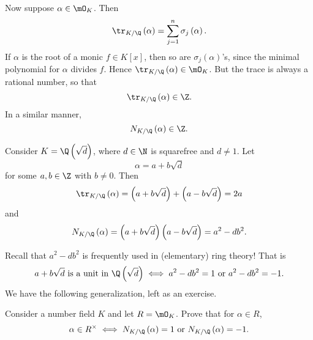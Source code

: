 \documentclass[pmath441]{subfiles}
\begin{document}
    Now suppose $\alpha\in\mO_K$. Then
    \begin{equation*}
        \tr_{K /\Q}\left( \alpha \right) = \sum^{n}_{j=1} \sigma_j\left( \alpha \right).
    \end{equation*}
    If $\alpha$ is the root of a monic $f\in K\left[ x \right]$, then so are $\sigma_j\left( \alpha \right)$'s, since the minimal polynomial for $\alpha$ divides $f$. Hence $\tr_{K /\Q}\left( \alpha \right)\in\mO_K$. But the trace is always a rational number, so that
    \begin{equation*}
        \tr_{K /\Q}\left( \alpha \right)\in\Z.
    \end{equation*}
    In a similar manner,
    \begin{equation*}
        N_{K /\Q}\left( \alpha \right)\in\Z.
    \end{equation*}
    
    \begin{example}{}
        Consider $K=\Q\left( \sqrt{d} \right)$, where $d\in\N$ is squarefree and $d\neq 1$. Let
        \begin{equation*}
            \alpha = a+b\sqrt{d}
        \end{equation*}
        for some $a,b\in\Z$ with $b\neq 0$. Then
        \begin{equation*}
            \tr_{K /\Q}\left( \alpha \right) = \left( a+b\sqrt{d} \right) + \left( a-b\sqrt{d} \right) = 2a
        \end{equation*}
        and
        \begin{equation*}
            N_{K /\Q}\left( \alpha \right) = \left( a+b\sqrt{d} \right)\left( a-b\sqrt{d} \right) = a^{2}-db^{2}.
        \end{equation*}
    \end{example}

    \rruleline

    \np Recall that $a^{2}-db^{2}$ is frequently used in (elementary) ring theory! That is
    \begin{equation*}
        \text{$a+b\sqrt{d}$ is a unit in $\Q\left( \sqrt{d} \right)$} \iff a^{2}-db^{2} = 1 \text{ or } a^{2}-db^{2} = -1.
    \end{equation*}
    We have the following generalization, left as an exercise.

    \begin{exercise}{}
        Consider a number field $K$ and let $R = \mO_K$. Prove that for $\alpha\in R$,
        \begin{equation*}
            \alpha\in R^{\times}\iff N_{K /\Q}\left( \alpha \right) = 1 \text{ or } N_{K /\Q}\left( \alpha \right) = -1.
        \end{equation*}
    \end{exercise}
\end{document}
